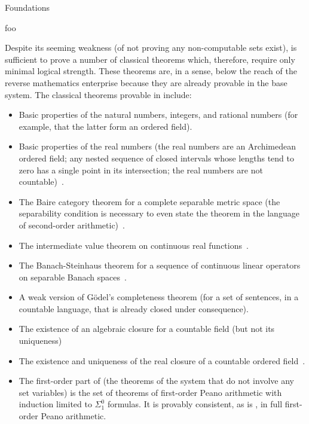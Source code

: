 \documentclass[12pt]{PalisadesLakesBook}
\begin{document}
\begin{plSection}{Foundations}
\begin{plSection}{\texorpdfstring{}{RCA0}}
  \begin{plQuote}
  {}%
  {foo}%
  {%
    Despite its seeming weakness (of not proving any non-computable sets exist), 
     is sufficient to prove a number of classical theorems which, therefore, 
    require only minimal logical strength. 
    These theorems are, in a sense, below the reach of the reverse mathematics enterprise 
    because they are already provable in the base system. 
    The classical theorems provable in  include:
  \begin{itemize}
    \item Basic properties of the natural numbers, integers, and rational numbers (for example,
    that the latter form an ordered field).
    \item Basic properties of the real numbers (the real numbers are an Archimedean ordered field;
    any nested sequence of closed intervals whose lengths tend to zero has a single point in its intersection;
    the real numbers are not countable)~\cite[Section II.4]{Simpson:2009:Subsystems}.
    \item The Baire category theorem for a complete separable metric space
    (the separability condition is necessary to even state the theorem in the language of second-order
    arithmetic)~\cite[Theorem II.5.8]{Simpson:2009:Subsystems}.
    \item The intermediate value theorem on continuous real
    functions~\cite[Theorem II.6.6]{Simpson:2009:Subsystems}.
    \item The Banach-Steinhaus theorem for a sequence of continuous linear operators
    on separable Banach spaces~\cite[theorem II.10.8]{Simpson:2009:Subsystems}.
    \item A weak version of G\"{o}del's completeness theorem (for a set of sentences, in a countable language,
    that is already closed under consequence).
    \item The existence of an algebraic closure for a countable field
    (but not its uniqueness)~\cite[Sections II.9.4--II.9.8]{Simpson:2009:Subsystems}
    \item The existence and uniqueness of the real closure
    of a countable ordered field~\cite[Sections II.9.5, II.9.7]{Simpson:2009:Subsystems}.
    \item The first-order part of  (the theorems of the system that do not involve any set variables)
    is the set of theorems of first-order Peano arithmetic with induction limited to $\Sigma^{0}_{1}$ formulas.
    It is provably consistent, as is , in full first-order Peano arithmetic.
  \end{itemize}
  }
  \end{plQuote}


\end{plSection}
\end{plSection}
\end{document}
